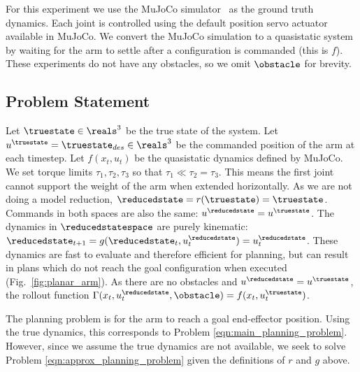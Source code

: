 For this experiment we use the MuJoCo simulator~\cite{mujoco} as the ground truth dynamics. Each joint is controlled using the default position servo actuator available in MuJoCo.
We convert the MuJoCo simulation to a quasistatic system by waiting for the arm to settle after a configuration is commanded (this is $f$).
These experiments do not have any obstacles, so we omit $\obstacle$ for brevity.


\subsection{Problem Statement}

Let $\truestate \in \reals^3$ be the true state of the system. Let $u^\truestate = \truestate_{des} \in \reals^3$ be the commanded position of the arm at each timestep. Let $f(x_t, u_t)$ be the quasistatic dynamics defined by MuJoCo. We set torque limits $\tau_1, \tau_2, \tau_3$ so that $\tau_1 \ll \tau_2 = \tau_3$. This means the first joint cannot support the weight of the arm when extended horizontally. As we are not doing a model reduction, $\reducedstate = r(\truestate) = \truestate$. Commands in both spaces are also the same: $u^\reducedstate = u^\truestate$. The dynamics in $\reducedstatespace$ are purely kinematic: $\reducedstate_{t+1} = g(\reducedstate_t, u^\reducedstate_t) = u^\reducedstate_t$. These dynamics are fast to evaluate and therefore efficient for planning, but can result in plans which do not reach the goal configuration when executed (Fig.~\ref{fig:planar_arm}). As there are no obstacles and $u^\reducedstate = u^\truestate$, the rollout function $\Gamma(x_t, u^\reducedstate_t, \obstacle) = f(x_t, u_t^\truestate)$.

The planning problem is for the arm to reach a goal end-effector position. Using the true dynamics, this corresponds to Problem \eqref{eqn:main_planning_problem}. However, since we assume the true dynamics are not available, we seek to solve Problem \eqref{eqn:approx_planning_problem} given the definitions of $r$ and $g$ above.


